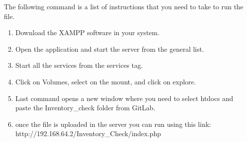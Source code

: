 The following command is a list of instructions that you need to take to run the file.
\begin{enumerate}
    \item Download the XAMPP software in your system.
    \item Open the application and start the server from the general list.
    \item Start all the services from the services tag.
    \item Click on Volumes, select on the mount, and click on explore.
    \item Last command opens a new window where you need to select htdocs and paste the Inventory\_check folder from GitLab.
    \item once the file is uploaded in the server you can run using this link: http://192.168.64.2/Inventory\_Check/index.php
\end{enumerate}